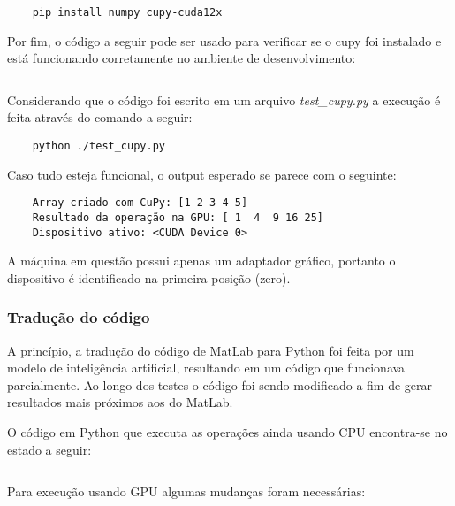 \documentclass[12pt,a4paper]{article}
\begin{document}
\begin{verbatim}
    pip install numpy cupy-cuda12x
\end{verbatim}

Por fim, o código a seguir pode ser usado para verificar se o cupy foi instalado e está funcionando corretamente no ambiente de desenvolvimento:

\inputminted{python}{cfd_on_gpu/teste_cupy.py}

Considerando que o código foi escrito em um arquivo \emph{test\_cupy.py} a execução é feita através do comando a seguir:

\begin{verbatim}
    python ./test_cupy.py
\end{verbatim}

Caso tudo esteja funcional, o output esperado se parece com o seguinte:

\begin{verbatim}
    Array criado com CuPy: [1 2 3 4 5]
    Resultado da operação na GPU: [ 1  4  9 16 25]
    Dispositivo ativo: <CUDA Device 0>
\end{verbatim}

A máquina em questão possui apenas um adaptador gráfico, portanto o dispositivo é identificado na primeira posição (zero).


\subsubsection{Tradução do código}

A princípio, a tradução do código de MatLab para Python foi feita por um modelo de inteligência artificial, resultando em um código que funcionava parcialmente. Ao longo dos testes o código foi sendo modificado a fim de gerar resultados mais próximos aos do MatLab.

O código em Python que executa as operações ainda usando CPU encontra-se no estado a seguir:

\inputminted{python}{cfd_on_gpu/aula15_exercicio_VolumesFinitos_Poiseuille_Flow_2D.py}

Para execução usando GPU algumas mudanças foram necessárias:

\inputminted{python}{cfd_on_gpu/aula15_exercicio_VolumesFinitos_Poiseuille_Flow_2D_GPU.py}
\end{document}
